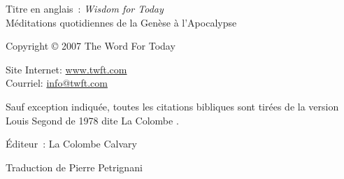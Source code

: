 \newpage
\mbox{}
\vfill
\noindent Titre en anglais~: \emph{Wisdom for Today}\\
Méditations quotidiennes de la Genèse à l'Apocalypse

\noindent Copyright \copyright{} 2007 The Word For Today

\noindent Site Internet: \url{www.twft.com}\\
\noindent Courriel: \url{info@twft.com}

\noindent Sauf exception indiquée, toutes les citations bibliques sont tirées de
 la version Louis Segond de 1978 dite \og La Colombe \fg{}.


\noindent Éditeur~: La Colombe Calvary

\noindent Traduction de Pierre Petrignani

